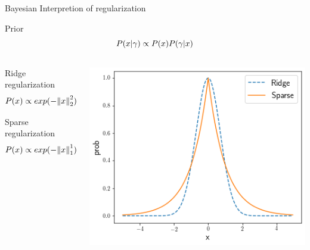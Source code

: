 \documentclass[10pt]{beamer}
\begin{document}
\begin{frame}{Bayesian Interpretion of regularization}
\begin{alertblock}{Prior}
\begin{equation}\notag
P(x|\gamma) \propto P(x)P(\gamma|x)
\end{equation}
\end{alertblock}

\begin{columns}
\begin{column}{0.5\textwidth}
\begin{alertblock}{Ridge regularization}
\begin{equation}\notag
P(x) \propto exp(-\norm{x}_2^2)
\end{equation}
\end{alertblock}

\begin{alertblock}{Sparse regularization}
\begin{equation} \notag
P(x) \propto exp(-\norm{x}_1^1)
\end{equation}

\end{alertblock}
\end{column}
\begin{column}{0.6\textwidth}
\centering
\includegraphics[height=.8\textwidth]{prior_ridge_sparse.png}
\end{column}
\end{columns}
\end{frame}
\end{document}
